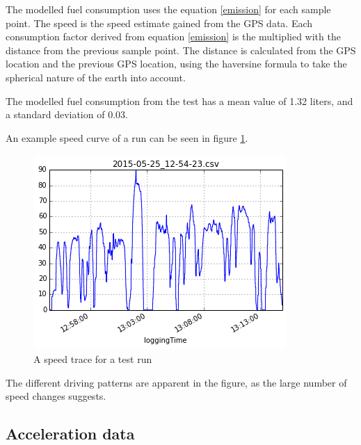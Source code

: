 The modelled fuel consumption uses the equation \ref{emission} for each sample point. The speed is the speed estimate gained from the GPS data. Each consumption factor derived from  equation \ref{emission} is the multiplied with the distance from the previous sample point. The distance is calculated from the GPS location and the previous GPS location, using the haversine formula \cite{rick1999deriving} to take the spherical nature of the earth into account.

The modelled fuel consumption from the test has a mean value of 1.32 liters, and a standard deviation of 0.03.

An example speed curve of a run can be seen in figure \ref{speed}.

\begin{figure}[h]
  \includegraphics[scale=0.5]{speed}
  \caption{A speed trace for a test run}
  \label{speed}
\end{figure}

The different driving patterns are apparent in the figure, as the large number of speed changes suggests.

\subsection{Acceleration data}

